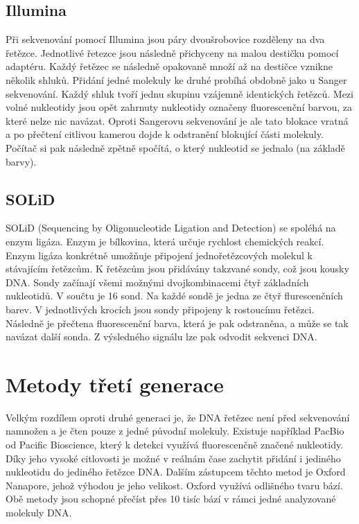 \documentclass[czech,DP]{thesiskiv}
\numberwithin{equation}{section}
\begin{document}
\subsection{Illumina}
Při sekvenování pomocí Illumina jsou páry dvoušrobovice rozděleny na dva řetězce. Jednotlivé řetezce jsou následně přichyceny na malou destičku pomocí adaptéru. Každý řetězec se následně opakovaně množí až na destičce vznikne několik shluků. Přidání jedné molekuly ke druhé probíhá obdobně jako u Sanger sekvenování. Každý shluk tvoří jednu skupinu vzájemně identických řetězců. Mezi volné nukleotidy jsou opět zahrnuty nukleotidy označeny fluorescenční barvou, za které nelze nic navázat. Oproti Sangerovu sekvenování je ale tato blokace vratná a po přečtení citlivou kamerou dojde k odstranění blokující části molekuly. Počítač si pak následně zpětně spočítá, o který nukleotid se jednalo (na základě barvy). \cite{illumina} \cite{sekvenovani_ziva} 


\subsection{SOLiD}
SOLiD (Sequencing by Oligonucleotide Ligation and Detection) se spoléhá na enzym ligáza. Enzym je bílkovina, která určuje rychlost chemických reakcí. Enzym ligáza konkrétně umožňuje připojení jednořetězcových molekul k stávajícím řetězcům. K řetězcům jsou přidávány takzvané sondy, což jsou kousky DNA. Sondy začínají všemi možnými dvojkombinacemi čtyř základních nukleotidů. V součtu je 16 sond. Na každé sondě je jedna ze čtyř flurescenčních barev. V jednotlivých krocích jsou sondy připojeny k rostoucímu řetězci. Následně je přečtena fluorescenční barva, která je pak odstraněna, a může se tak navázat další sonda. Z výsledného signálu lze pak odvodit sekvenci DNA.


\section{Metody třetí generace}
Velkým rozdílem oproti druhé generaci je, že DNA řetězec není před sekvenování namnožen a je čten pouze z jedné původní molekuly. Existuje například PacBio od Pacific Bioscience, který k detekci využívá fluorescenčně značené nukleotidy. Díky jeho vysoké citlovosti je možné v reálnám čase zachytit přidání i jediného nukleotidu do jediného řetězce DNA. Dalším zástupcem těchto metod je Oxford Nanapore, jehož výhodou je jeho velikost. Oxford využívá odlišného tvaru bází. Obě metody jsou schopné přečíst přes 10 tisíc bází v rámci jedné analyzované molekuly DNA. 
\end{document}

